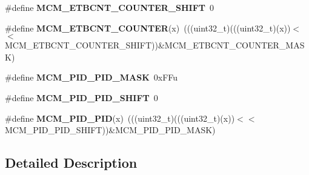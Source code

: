\begin{DoxyCompactItemize}
\item 
\#define {\bfseries M\+C\+M\+\_\+\+E\+T\+B\+C\+N\+T\+\_\+\+C\+O\+U\+N\+T\+E\+R\+\_\+\+S\+H\+I\+FT}~0\hypertarget{group__MCM__Register__Masks_ga6f3bfee5c1a266db914bfcce1b33e40f}{}\label{group__MCM__Register__Masks_ga6f3bfee5c1a266db914bfcce1b33e40f}

\item 
\#define {\bfseries M\+C\+M\+\_\+\+E\+T\+B\+C\+N\+T\+\_\+\+C\+O\+U\+N\+T\+ER}(x)~(((uint32\+\_\+t)(((uint32\+\_\+t)(x))$<$$<$M\+C\+M\+\_\+\+E\+T\+B\+C\+N\+T\+\_\+\+C\+O\+U\+N\+T\+E\+R\+\_\+\+S\+H\+I\+FT))\&M\+C\+M\+\_\+\+E\+T\+B\+C\+N\+T\+\_\+\+C\+O\+U\+N\+T\+E\+R\+\_\+\+M\+A\+SK)\hypertarget{group__MCM__Register__Masks_ga14675877220745e714191f35ea848ee5}{}\label{group__MCM__Register__Masks_ga14675877220745e714191f35ea848ee5}

\item 
\#define {\bfseries M\+C\+M\+\_\+\+P\+I\+D\+\_\+\+P\+I\+D\+\_\+\+M\+A\+SK}~0x\+F\+Fu\hypertarget{group__MCM__Register__Masks_ga258efdcb0108c5e954d399d9a6e8883a}{}\label{group__MCM__Register__Masks_ga258efdcb0108c5e954d399d9a6e8883a}

\item 
\#define {\bfseries M\+C\+M\+\_\+\+P\+I\+D\+\_\+\+P\+I\+D\+\_\+\+S\+H\+I\+FT}~0\hypertarget{group__MCM__Register__Masks_ga579f075ec9afb3010ecf64eea087a04a}{}\label{group__MCM__Register__Masks_ga579f075ec9afb3010ecf64eea087a04a}

\item 
\#define {\bfseries M\+C\+M\+\_\+\+P\+I\+D\+\_\+\+P\+ID}(x)~(((uint32\+\_\+t)(((uint32\+\_\+t)(x))$<$$<$M\+C\+M\+\_\+\+P\+I\+D\+\_\+\+P\+I\+D\+\_\+\+S\+H\+I\+FT))\&M\+C\+M\+\_\+\+P\+I\+D\+\_\+\+P\+I\+D\+\_\+\+M\+A\+SK)\hypertarget{group__MCM__Register__Masks_ga6d4eaf3c8f87daf3e83324656d130eb6}{}\label{group__MCM__Register__Masks_ga6d4eaf3c8f87daf3e83324656d130eb6}

\end{DoxyCompactItemize}


\subsection{Detailed Description}
